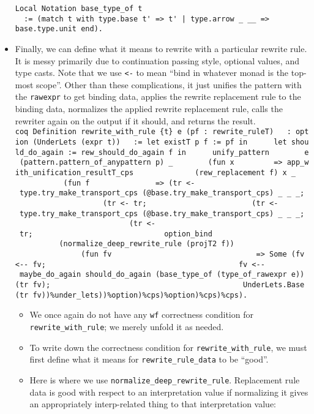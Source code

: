 \begin{itemize}
\begin{verbatim}
Local Notation base_type_of t
  := (match t with type.base t' => t' | type.arrow _ __ => base.type.unit end).
\end{verbatim}
\item
  Finally, we can define what it means to rewrite with a particular
  rewrite rule. It is messy primarily due to continuation passing style,
  optional values, and type casts. Note that we use
  \texttt{\textless{}-} to mean ``bind in whatever monad is the top-most
  scope''. Other than these complications, it just unifies the pattern
  with the \texttt{rawexpr} to get binding data, applies the rewrite
  replacement rule to the binding data, normalizes the applied rewrite
  replacement rule, calls the rewriter again on the output if it should,
  and returns the result.
  \texttt{coq\ Definition\ rewrite\_with\_rule\ \{t\}\ e\textquotesingle{}\ (pf\ :\ rewrite\_ruleT)\ ~\ :\ option\ (UnderLets\ (expr\ t))\ ~\ :=\ let\ \textquotesingle{}existT\ p\ f\ :=\ pf\ in\ ~\ ~\ ~let\ should\_do\_again\ :=\ rew\_should\_do\_again\ f\ in\ ~\ ~\ ~unify\_pattern\ ~\ ~\ ~\ ~e\textquotesingle{}\ (pattern.pattern\_of\_anypattern\ p)\ \_\ ~\ ~\ ~\ ~(fun\ x\ ~\ ~\ ~\ ~\ =\textgreater{}\ app\_with\_unification\_resultT\_cps\ ~\ ~\ ~\ ~\ ~\ ~\ ~(rew\_replacement\ f)\ x\ \_\ ~\ ~\ ~\ ~\ ~\ ~\ ~(fun\ f\textquotesingle{}\ ~\ ~\ ~\ ~\ ~\ ~\ ~\ =\textgreater{}\ (tr\ \textless{}-\ type.try\_make\_transport\_cps\ (@base.try\_make\_transport\_cps)\ \_\ \_\ \_;\ ~\ ~\ ~\ ~\ ~\ ~\ ~\ ~\ ~\ ~\ (tr\ \textless{}-\ tr;\ ~\ ~\ ~\ ~\ ~\ ~\ ~\ ~\ ~\ ~\ ~\ ~(tr\textquotesingle{}\ \textless{}-\ type.try\_make\_transport\_cps\ (@base.try\_make\_transport\_cps)\ \_\ \_\ \_;\ ~\ ~\ ~\ ~\ ~\ ~\ ~\ ~\ ~\ ~\ ~\ ~\ ~\ (tr\textquotesingle{}\ \textless{}-\ tr\textquotesingle{};\ ~\ ~\ ~\ ~\ ~\ ~\ ~\ ~\ ~\ ~\ ~\ ~\ ~\ ~\ ~option\_bind\textquotesingle{}\ ~\ ~\ ~\ ~\ ~\ ~\ ~\ ~\ ~\ ~\ ~\ ~\ ~\ ~\ ~\ ~(normalize\_deep\_rewrite\_rule\ (projT2\ f\textquotesingle{}))\ ~\ ~\ ~\ ~\ ~\ ~\ ~\ ~\ ~\ ~\ ~\ ~\ ~\ ~\ ~\ ~(fun\ fv\ ~\ ~\ ~\ ~\ ~\ ~\ ~\ ~\ ~\ ~\ ~\ ~\ ~\ ~\ ~\ ~\ =\textgreater{}\ Some\ (fv\ \textless{}-\/-\ fv;\ ~\ ~\ ~\ ~\ ~\ ~\ ~\ ~\ ~\ ~\ ~\ ~\ ~\ ~\ ~\ ~\ ~\ ~\ ~\ ~\ ~\ ~fv\ \textless{}-\/-\ maybe\_do\_again\ should\_do\_again\ (base\_type\_of\ (type\_of\_rawexpr\ e\textquotesingle{}))\ (tr\ fv);\ ~\ ~\ ~\ ~\ ~\ ~\ ~\ ~\ ~\ ~\ ~\ ~\ ~\ ~\ ~\ ~\ ~\ ~\ ~\ ~\ ~\ ~UnderLets.Base\ (tr\textquotesingle{}\ fv))\%under\_lets))\%option)\%cps)\%option)\%cps)\%cps).}

  \begin{itemize}
  \item
    We once again do not have any \texttt{wf} correctness condition for
    \texttt{rewrite\_with\_rule}; we merely unfold it as needed.
  \item
    To write down the correctness condition for
    \texttt{rewrite\_with\_rule}, we must first define what it means for
    \texttt{rewrite\_rule\_data} to be ``good''.
  \item
    Here is where we use \texttt{normalize\_deep\_rewrite\_rule}.
    Replacement rule data is good with respect to an interpretation
    value if normalizing it gives an appropriately interp-related thing
    to that interpretation value:


\end{itemize}
\end{itemize}
